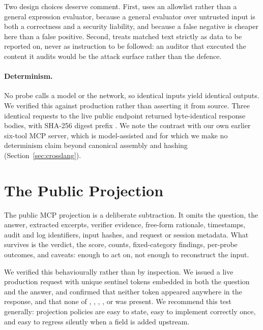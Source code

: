 Two design choices deserve comment. First,  uses an allowlist
rather than a general expression evaluator, because a general evaluator over untrusted
input is both a correctness and a security liability, and because a false negative is
cheaper here than a false positive. Second,  treats matched text
strictly as data to be reported on, never as instruction to be followed: an auditor that
executed the content it audits would be the attack surface rather than the defence.

\paragraph{Determinism.}
No probe calls a model or the network, so identical inputs yield identical outputs. We
verified this against production rather than asserting it from source. Three identical
requests to the live public endpoint returned byte-identical response bodies, with SHA-256
digest prefix . We note the contrast with our own earlier six-tool MCP
server, which is model-assisted and for which we make no determinism claim beyond
canonical assembly and hashing (Section~\ref{sec:crosslang}).

\section{The Public Projection}
\label{sec:privacy}

The public MCP projection is a deliberate subtraction. It omits the question, the answer,
extracted excerpts, verifier evidence, free-form rationale, timestamps, audit and log
identifiers, input hashes, and request or session metadata. What survives is the verdict,
the score, counts, fixed-category findings, per-probe outcomes, and caveats: enough to act
on, not enough to reconstruct the input.

We verified this behaviourally rather than by inspection. We issued a live production
request with unique sentinel tokens embedded in both the question and the answer, and
confirmed that neither token appeared anywhere in the response, and that none of
, , , , or
 was present. We recommend this test generally: projection policies are easy
to state, easy to implement correctly once, and easy to regress silently when a field is
added upstream.


